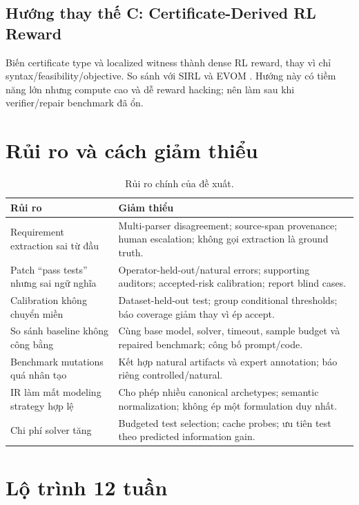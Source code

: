 \documentclass[11pt,a4paper]{article}
\begin{document}
\subsection{Hướng thay thế C: Certificate-Derived RL Reward}

Biến certificate type và localized witness thành dense RL reward, thay vì chỉ syntax/feasibility/objective. So sánh với SIRL và EVOM \parencite{chen2025sirl,guan2026evom}. Hướng này có tiềm năng lớn nhưng compute cao và dễ reward hacking; nên làm sau khi verifier/repair benchmark đã ổn.

\section{Rủi ro và cách giảm thiểu}

\begin{table}[htbp]
\centering
\caption{Rủi ro chính của đề xuất.}
\small
\begin{tabularx}{\textwidth}{Y Y}
\toprule
\textbf{Rủi ro} & \textbf{Giảm thiểu} \\
\midrule
Requirement extraction sai từ đầu & Multi-parser disagreement; source-span provenance; human escalation; không gọi extraction là ground truth. \\
Patch ``pass tests'' nhưng sai ngữ nghĩa & Operator-held-out/natural errors; supporting auditors; accepted-risk calibration; report blind cases. \\
Calibration không chuyển miền & Dataset-held-out test; group conditional thresholds; báo coverage giảm thay vì ép accept. \\
So sánh baseline không công bằng & Cùng base model, solver, timeout, sample budget và repaired benchmark; công bố prompt/code. \\
Benchmark mutations quá nhân tạo & Kết hợp natural artifacts và expert annotation; báo riêng controlled/natural. \\
IR làm mất modeling strategy hợp lệ & Cho phép nhiều canonical archetypes; semantic normalization; không ép một formulation duy nhất. \\
Chi phí solver tăng & Budgeted test selection; cache probes; ưu tiên test theo predicted information gain. \\
\bottomrule
\end{tabularx}
\end{table}

\section{Lộ trình 12 tuần}
\end{document}
